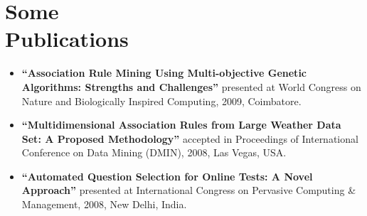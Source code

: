 \documentclass{article}
\begin{document}
\section{Some \\ Publications}
\begin{itemize}[leftmargin=-1ex]\setlength\itemsep{0.25em}\vspace{-10pt}
\item \textbf{``Association Rule Mining Using Multi-objective Genetic Algorithms: Strengths and Challenges''} presented at World Congress on Nature and Biologically Inspired Computing, 2009, Coimbatore. 
\item \textbf{``Multidimensional Association Rules from Large Weather Data Set: A Proposed Methodology''} accepted in Proceedings of International Conference on  Data Mining (DMIN), 2008, Las Vegas, USA. 
\item \textbf{``Automated Question Selection for Online Tests: A Novel Approach''} presented at International Congress on Pervasive Computing \& Management, 2008, New Delhi, India. 
\end{itemize}
\end{document}
